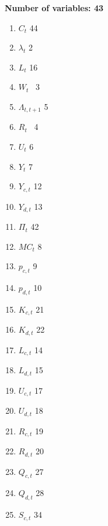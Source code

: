 \documentclass{article}
\begin{document}
\textbf{Number of variables: 43}

\begin{enumerate}
\item $C_{t}$ 44

\item $\lambda _{t}$ 2

\item $L_{t}$ 16

\item $W_{t}$ \ 3

\item $\Lambda _{t,t+1}$ 5

\item $R_{t}$ \ 4

\item $U_{t}$ 6

\item $Y_{t}$ 7

\item $Y_{c,t}$ 12

\item $Y_{d,t}$ 13

\item $\Pi _{t}$ 42

\item $MC_{t}$ 8

\item $p_{c,t}$ 9

\item $p_{d,t}$ 10

\item $K_{c,t}$ 21

\item $K_{d,t}$ 22

\item $L_{c,t}$ 14

\item $L_{d,t}$ 15

\item $U_{c,t}$ 17

\item $U_{d,t}$ 18

\item $R_{c,t}$ 19

\item $R_{d,t}$ 20

\item $Q_{c,t}$ 27

\item $Q_{d,t}$ 28

\item $S_{c,t}$ 34


\end{enumerate}
\end{document}
